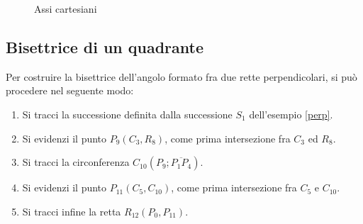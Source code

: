 \begin{figure}[!h]
\begin{center}
\caption{Assi cartesiani}
\end{center}
\end{figure}


\subsection{Bisettrice di un quadrante} \label{bisett}
Per costruire la bisettrice dell'angolo formato fra due rette perpendicolari, si può procedere nel seguente modo:

\begin{enumerate}

\item Si tracci la successione definita dalla successione $S_{1}$ dell'esempio \ref{perp}.

\item Si evidenzi il punto $P_{9}(C_{3}, R_{8})$, come prima intersezione fra $C_{3}$ ed $R_{8}$.

\item Si tracci la circonferenza  $C_{10}(P_{9}; \overline{P_{1} P_{4}} )$.

\item Si evidenzi il punto $P_{11}(C_{5}, C_{10})$, come prima intersezione fra $C_{5}$ e $C_{10}$.

\item Si tracci infine la retta $R_{12}(P_{0}, P_{11} )$. 

\end{enumerate}

